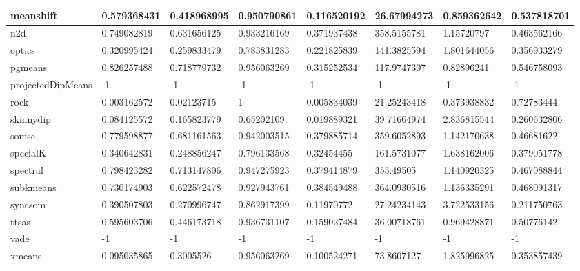 \begin{table}[H]
\begin{tabular}{|l|l|l|l|l|l|l|l|}
\hline
meanshift & 0.579368431 & 0.418968995 & 0.950790861 & 0.116520192 & 26.67994273 & 0.859362642 & 0.537818701 \\
\hline
n2d & 0.749082819 & 0.631656125 & 0.933216169 & 0.371937438 & 358.5155781 & 1.15720797 & 0.463562166 \\
\hline
optics & 0.320995424 & 0.259833479 & 0.783831283 & 0.221825839 & 141.3825594 & 1.801644056 & 0.356933279 \\
\hline
pgmeans & 0.826257488 & 0.718779732 & 0.956063269 & 0.315252534 & 117.9747307 & 0.82896241 & 0.546758093 \\
\hline
projectedDipMeans & -1 & -1 & -1 & -1 & -1 & -1 & -1 \\
\hline
rock & 0.003162572 & 0.02123715 & 1 & 0.005834039 & 21.25243418 & 0.373938832 & 0.72783444 \\
\hline
skinnydip & 0.084125572 & 0.165823779 & 0.65202109 & 0.019889321 & 39.71664974 & 2.836815544 & 0.260632806 \\
\hline
somsc & 0.779598877 & 0.681161563 & 0.942003515 & 0.379885714 & 359.6052893 & 1.142170638 & 0.46681622 \\
\hline
specialK & 0.340642831 & 0.248856247 & 0.796133568 & 0.32454455 & 161.5731077 & 1.638162006 & 0.379051778 \\
\hline
spectral & 0.798423282 & 0.713147806 & 0.947275923 & 0.379414879 & 355.49505 & 1.140920325 & 0.467088844 \\
\hline
subkmeans & 0.730174903 & 0.622572478 & 0.927943761 & 0.384549488 & 364.0930516 & 1.136335291 & 0.468091317 \\
\hline
syncsom & 0.390507803 & 0.270996747 & 0.862917399 & 0.11970772 & 27.24234143 & 3.722533156 & 0.211750763 \\
\hline
ttsas & 0.595603706 & 0.446173718 & 0.936731107 & 0.159027484 & 36.00718761 & 0.969428871 & 0.50776142 \\
\hline
vade & -1 & -1 & -1 & -1 & -1 & -1 & -1 \\
\hline
xmeans & 0.095035865 & 0.3005526 & 0.956063269 & 0.100524271 & 73.8607127 & 1.825996825 & 0.353857439 \\
\hline
\end{tabular}
\end{table}